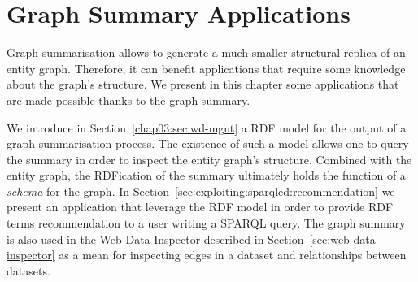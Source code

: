 \chapter{Graph Summary Applications}
\label{chap:system}

Graph summarisation allows to generate a much smaller structural replica of an entity graph. Therefore, it can benefit applications that require some knowledge about the graph's structure. We present in this chapter some applications that are made possible thanks to the graph summary.

We introduce in Section~\ref{chap03:sec:wd-mgnt} a RDF model for the output of a graph summarisation process. The existence of such a model allows one to query the summary in order to inspect the entity graph's structure. Combined with the entity graph, the RDFication of the summary ultimately holds the function of a \emph{schema} for the graph. In Section~\ref{sec:exploiting:sparqled:recommendation} we present an application that leverage the RDF model in order to provide RDF terms recommendation to a user writing a SPARQL query. The graph summary is also used in the Web Data Inspector described in Section~\ref{sec:web-data-inspector} as a mean for inspecting edges in a dataset and relationships between datasets.
